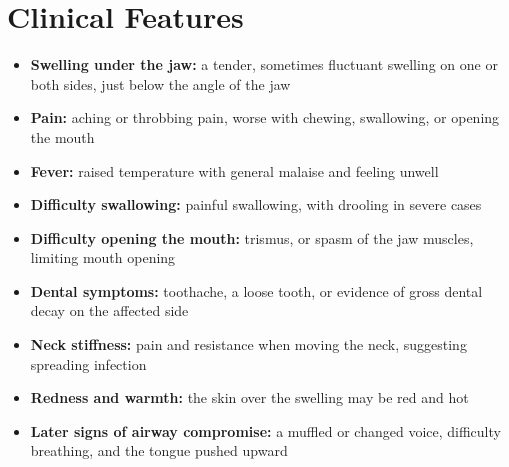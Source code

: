 \section*{Clinical Features}
\begin{itemize}
    \item \textbf{Swelling under the jaw:} a tender, sometimes fluctuant swelling on one or both sides, just below the angle of the jaw
    \item \textbf{Pain:} aching or throbbing pain, worse with chewing, swallowing, or opening the mouth
    \item \textbf{Fever:} raised temperature with general malaise and feeling unwell
    \item \textbf{Difficulty swallowing:} painful swallowing, with drooling in severe cases
    \item \textbf{Difficulty opening the mouth:} trismus, or spasm of the jaw muscles, limiting mouth opening
    \item \textbf{Dental symptoms:} toothache, a loose tooth, or evidence of gross dental decay on the affected side
    \item \textbf{Neck stiffness:} pain and resistance when moving the neck, suggesting spreading infection
    \item \textbf{Redness and warmth:} the skin over the swelling may be red and hot
    \item \textbf{Later signs of airway compromise:} a muffled or changed voice, difficulty breathing, and the tongue pushed upward
\end{itemize}

